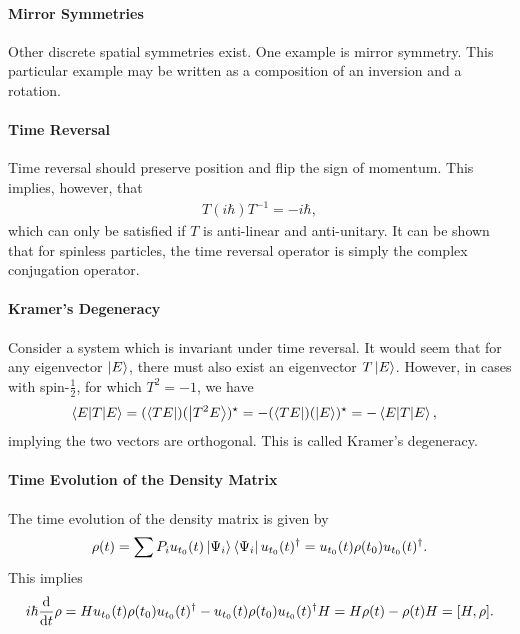 \paragraph{Mirror Symmetries}
Other discrete spatial symmetries exist. One example is mirror symmetry. This particular example may be written as a composition of an inversion and a rotation.

\paragraph{Time Reversal}
Time reversal should preserve position and flip the sign of momentum. This implies, however, that
\begin{align*}
	T(i\hbar)T^{-1} = -i\hbar,
\end{align*}
which can only be satisfied if $T$ is anti-linear and anti-unitary. It can be shown that for spinless particles, the time reversal operator is simply the complex conjugation operator.

\paragraph{Kramer's Degeneracy}
Consider a system which is invariant under time reversal. It would seem that for any eigenvector $\ket{E}$, there must also exist an eigenvector $T\ket{E}$. However, in cases with spin-$\frac{1}{2}$, for which $T^{2} = -1$, we have
\begin{align*}
	\mel{E}{T}{E} &= (\bra{TE})(\ket{T^{2}E})^{\star} = -(\bra{TE})(\ket{E})^{\star} = -\mel{E}{T}{E},
\end{align*}
implying the two vectors are orthogonal. This is called Kramer's degeneracy.

\paragraph{Time Evolution of the Density Matrix}
The time evolution of the density matrix is given by
\begin{align*}
	\rho(t) = \sum P_{i}u_{t_{0}}(t)\ket{\Psi_{i}}\bra{\Psi_{i}}u_{t_{0}}(t)^{\dagger} = u_{t_{0}}(t)\rho(t_{0})u_{t_{0}}(t)^{\dagger}.
\end{align*}
This implies
\begin{align*}
	i\hbar\dv{t}\rho = Hu_{t_{0}}(t)\rho(t_{0})\adj{u_{t_{0}}(t)} - u_{t_{0}}(t)\rho(t_{0})\adj{u_{t_{0}}(t)}H = H\rho(t) - \rho(t)H = \comm{H}{\rho}.
\end{align*}

